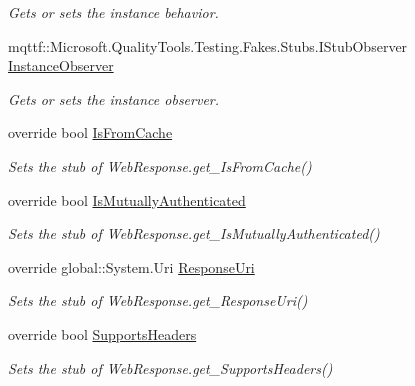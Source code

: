\begin{DoxyCompactItemize}
\begin{DoxyCompactList}\small\item\em Gets or sets the instance behavior.\end{DoxyCompactList}\item 
mqttf\-::\-Microsoft.\-Quality\-Tools.\-Testing.\-Fakes.\-Stubs.\-I\-Stub\-Observer \hyperlink{class_system_1_1_net_1_1_fakes_1_1_stub_web_response_a793953bbf5781ff39e118ed1cce4f564}{Instance\-Observer}
\begin{DoxyCompactList}\small\item\em Gets or sets the instance observer.\end{DoxyCompactList}\item 
override bool \hyperlink{class_system_1_1_net_1_1_fakes_1_1_stub_web_response_a106f46afa74a9c40e75b07c56eb8cd66}{Is\-From\-Cache}
\begin{DoxyCompactList}\small\item\em Sets the stub of Web\-Response.\-get\-\_\-\-Is\-From\-Cache()\end{DoxyCompactList}\item 
override bool \hyperlink{class_system_1_1_net_1_1_fakes_1_1_stub_web_response_af3f5721269b78780c9728c5158e73998}{Is\-Mutually\-Authenticated}
\begin{DoxyCompactList}\small\item\em Sets the stub of Web\-Response.\-get\-\_\-\-Is\-Mutually\-Authenticated()\end{DoxyCompactList}\item 
override global\-::\-System.\-Uri \hyperlink{class_system_1_1_net_1_1_fakes_1_1_stub_web_response_ab09ab6ed150da28d38d510e53b6ec91e}{Response\-Uri}
\begin{DoxyCompactList}\small\item\em Sets the stub of Web\-Response.\-get\-\_\-\-Response\-Uri()\end{DoxyCompactList}\item 
override bool \hyperlink{class_system_1_1_net_1_1_fakes_1_1_stub_web_response_a3d386d4bfc1c1a0c536adf84ffa4bfc9}{Supports\-Headers}
\begin{DoxyCompactList}\small\item\em Sets the stub of Web\-Response.\-get\-\_\-\-Supports\-Headers()\end{DoxyCompactList}\end{DoxyCompactItemize}


